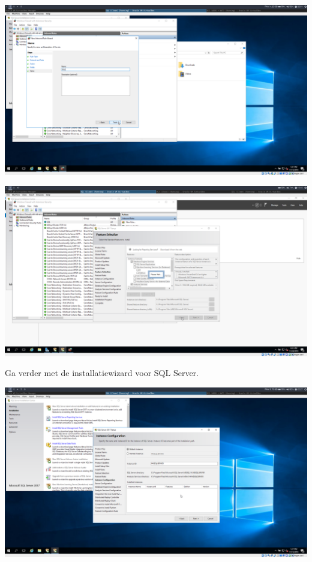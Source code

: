 \documentclass[a4paper]{article}
\begin{document}
\begin{center}
	\includegraphics[width=15cm]{Pictures/SQL/1542315679.png}
\end{center}
\begin{center}
	\includegraphics[width=15cm]{Pictures/SQL/1543408986.png}
	
	Ga verder met de installatiewizard voor SQL Server.
\end{center}
\begin{center}
	\includegraphics[width=15cm]{Pictures/SQL/1542317256.png}
	

\end{center}
\end{document}
